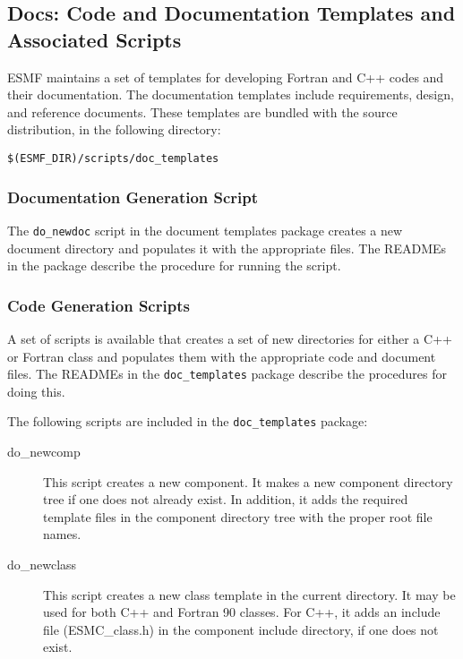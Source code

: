 
\subsection{Docs: Code and Documentation Templates and Associated Scripts}
\label{sec:code_templates}

ESMF maintains a set of templates for developing Fortran and 
C++ codes and their documentation.  The documentation templates
include requirements, design, and reference documents.
These templates are bundled with the source distribution, in 
the following directory:\newline
\begin{verbatim}
$(ESMF_DIR)/scripts/doc_templates 
\end{verbatim} 

\subsubsection{Documentation Generation Script}

The {\tt do\_newdoc} script in the document templates package creates
a new document directory and populates it with the appropriate files.
The READMEs in the package describe the procedure for running the 
script.

\subsubsection{Code Generation Scripts}
A set of scripts is available that creates a set of new directories for either 
a C++ or Fortran class and populates them with the appropriate code and 
document files.  The READMEs in the {\tt doc\_templates} 
package describe the procedures for doing this.  

The following scripts are included in the {\tt doc\_templates} package:
\begin{description}
\item [do\_newcomp] This script creates a new component. It makes a new component directory
tree if one does not already exist. In addition, it adds the required template files
in the component directory tree with the proper root file names.
\item [do\_newclass] This script creates a new class template in the current directory. 
It may be used for both C++ and Fortran 90 classes. For C++, it adds an include
file (ESMC\_class.h) in the component include directory, if one does not exist.
\end{description}

